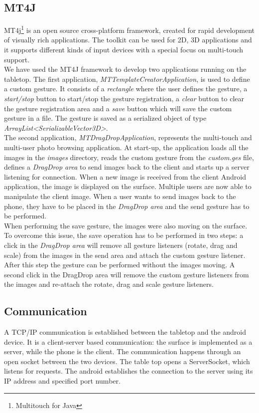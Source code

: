 \subsection{MT4J}
\label{sec.thesystem.mt4j}
MT4j\footnote{Multitouch for Java} is an open source cross-platform framework,
created for rapid development of visually rich applications. The toolkit can be
used for 2D, 3D applications and it supports different kinds of input devices with a
special focus on multi-touch support.\\

We have used the MT4J framework to develop two applications running on the
tabletop. The first application, \emph{MTTemplateCreatorApplication}, is used to
define a custom gesture. It consists of a \emph{rectangle} where the user defines the gesture, a \emph{start/stop} button
to start/stop the gesture registration, a \emph{clear} button to clear the
gesture registration area and a \emph{save} button which will save the custom
gesture in a file. The gesture is saved as a serialized object of type
\emph{ArrayList<SerializableVector3D>}.\\

The second application, \emph{MTDragDropApplication}, represents the multi-touch
and multi-user photo browsing application. At start-up, the application loads
all the images in the \emph{images} directory, reads the custom gesture from the
\emph{custom.ges} file, defines a \emph{DragDrop area} to send images back to
the client and starts up a server listening for connection. When a new image is received from the client Android application, the image is
displayed on the surface. Multiple users are now able to manipulate the client
image. When a user wants to send images back to the phone, they have to be
placed in the \emph{DragDrop area} and the send gesture has to be performed.\\

When performing the save gesture, the images were also moving on the surface.
To overcome this issue, the save operation has to be performed in two steps:
a click in the \emph{DragDrop area} will remove all gesture listeners (rotate,
drag and scale) from the images in the send area and attach the custom gesture
listener. After this step the gesture can be performed without the images
moving. A second click in the DragDrop area will remove the custom gesture
listeners from the images and re-attach the rotate, drag and scale gesture
listeners.

\subsection{Communication}
\label{sec.thesystem.communication}
A TCP/IP communication is established between the tabletop and the android
device. It is a client-server based communication: the surface is implemented
as a server, while the phone is the client. The communication happens through an
open socket between the two devices. The table top opens a ServerSocket, which
listens for requests. The android establishes the connection to the server using
its IP address and specified port number.

